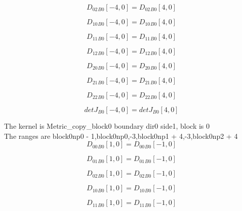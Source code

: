\documentclass{article}
\begin{document}
\begin{dmath}{D_{02}{_{B0}}}[{-4,0}] = {D_{02}{_{B0}}}[{4,0}]\end{dmath}

\begin{dmath}{D_{10}{_{B0}}}[{-4,0}] = {D_{10}{_{B0}}}[{4,0}]\end{dmath}

\begin{dmath}{D_{11}{_{B0}}}[{-4,0}] = {D_{11}{_{B0}}}[{4,0}]\end{dmath}

\begin{dmath}{D_{12}{_{B0}}}[{-4,0}] = {D_{12}{_{B0}}}[{4,0}]\end{dmath}

\begin{dmath}{D_{20}{_{B0}}}[{-4,0}] = {D_{20}{_{B0}}}[{4,0}]\end{dmath}

\begin{dmath}{D_{21}{_{B0}}}[{-4,0}] = {D_{21}{_{B0}}}[{4,0}]\end{dmath}

\begin{dmath}{D_{22}{_{B0}}}[{-4,0}] = {D_{22}{_{B0}}}[{4,0}]\end{dmath}

\begin{dmath}{detJ{_{B0}}}[{-4,0}] = {detJ{_{B0}}}[{4,0}]\end{dmath}

\noindent The kernel is Metric_copy_block0 boundary dir0 side1, block is 0\\\noindent The ranges are block0np0 - 1,block0np0,-3,block0np1 + 4,-3,block0np2 + 4\\\begin{dmath}{D_{00}{_{B0}}}[{1,0}] = {D_{00}{_{B0}}}[{-1,0}]\end{dmath}

\begin{dmath}{D_{01}{_{B0}}}[{1,0}] = {D_{01}{_{B0}}}[{-1,0}]\end{dmath}

\begin{dmath}{D_{02}{_{B0}}}[{1,0}] = {D_{02}{_{B0}}}[{-1,0}]\end{dmath}

\begin{dmath}{D_{10}{_{B0}}}[{1,0}] = {D_{10}{_{B0}}}[{-1,0}]\end{dmath}

\begin{dmath}{D_{11}{_{B0}}}[{1,0}] = {D_{11}{_{B0}}}[{-1,0}]\end{dmath}
\end{document}
